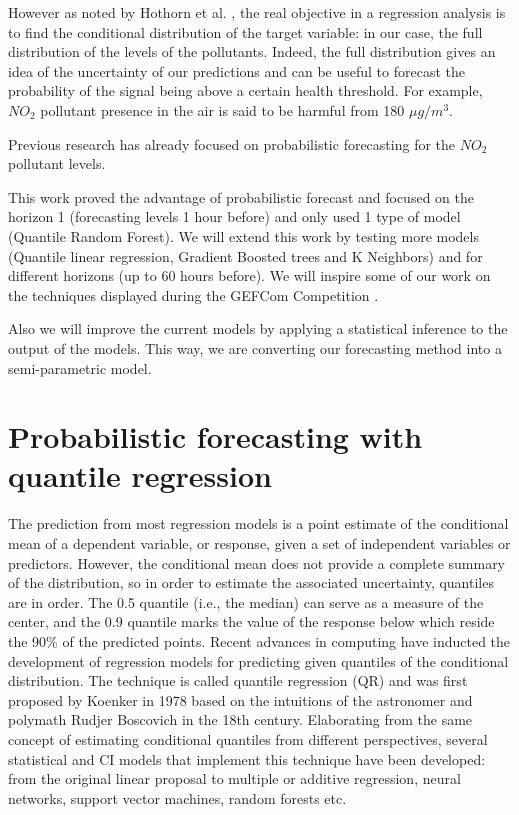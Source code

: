 \documentclass[a4paper,twocolumn,5p]{elsarticle}
\begin{document}
However as noted by Hothorn et al. \cite{hothorn_conditional_2014}, the real objective in a 
regression analysis is to find the conditional distribution of the target variable: in our 
case, the full distribution of the levels of the pollutants. Indeed, the full distribution 
gives an idea of the uncertainty of our predictions and can be useful to forecast the probability 
of the signal being above a certain health threshold. 
For example, $NO_2$ pollutant presence in the air is said to be harmful 
from 180 $\mu g / m^3$. 

Previous research \cite{proba_aznarte} has already focused on probabilistic forecasting
for the $NO_2$ pollutant levels.

This work proved the advantage of probabilistic forecast and 
focused on the horizon 1 (forecasting levels 1
hour before) and only used 1 type of model (Quantile Random Forest). We will 
extend this work by testing more models (Quantile linear regression, Gradient Boosted trees 
and K Neighbors) and for different horizons (up to 60 hours before). 
We will inspire some of 
our work on the techniques displayed during the GEFCom Competition 
\cite{mangalova_k-nearest_2016} \cite{hong_probabilistic_2016}.

Also we will improve the current models by applying a statistical inference to the output
of the models. This way, we are converting our forecasting method into a semi-parametric 
model.

\section{Probabilistic forecasting with quantile regression}
\label{sec:probForec}

The prediction from most regression models is a
point estimate of the conditional mean of a dependent variable, or
response, given a set of independent variables or predictors. However,
the conditional mean does not provide a complete summary
of the distribution, so in order to estimate the associated
uncertainty, quantiles are in order. The 0.5 quantile (i.e., the
median) can serve as a measure of the center, and the 0.9 quantile
marks the value of the response below which reside the 90\% of the
predicted points. Recent advances in computing have inducted the
development of regression models for predicting given quantiles of the
conditional distribution. The technique is called quantile regression
(QR) and was first proposed by Koenker in 1978
\cite{koenker_quantile_2001} based on the intuitions of the
astronomer and polymath Rudjer Boscovich in the 18th
century. Elaborating from the same concept of estimating conditional
quantiles from different perspectives, several statistical and CI
models that implement this technique have been developed: from the
original linear proposal to multiple or additive regression, neural
networks, support vector machines, random forests etc.
\end{document}
